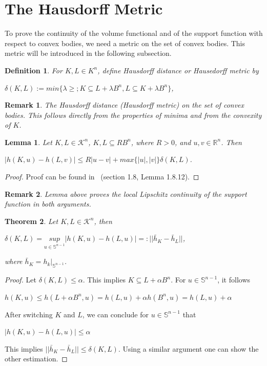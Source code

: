 \documentclass[a4paper]{book}
\newtheorem{theorem}{Theorem}%
\newtheorem{lemma}[theorem]{Lemma}%
\newtheorem{remark}{Remark}%
\newtheorem{definition}{Definition}%
\begin{document}
\section{The Hausdorff Metric}
To prove the continuity of the volume functional and of the support function with respect to convex bodies, we need a metric on the set of convex bodies. This metric will be introduced in the following subsection.

\begin{definition}
    For $K,L\in K^{n}$, define Hausdorff distance or Hausedorff metric by
    \begin{center}
        $\delta(K,L):=min\{\lambda\geq;K\subseteq L+\lambda B^{n},L\subseteq K+\lambda B^{n}\}$,
    \end{center}
\end{definition}

\begin{remark}
    The Hausdorff distance (Hausdorff metric) on the set of convex bodies. This follows directly from the properties of minima and from the convexity of $K$.
\end{remark}

\begin{lemma}
    Let $K,L\in\mathscr{K}^{n}$, $K,L\subseteq RB^{n}$, where $R>0$, and $u,v\in\mathbb{R}^{n}$. Then
    \begin{center}
        $|h(K,u)-h(L,v)|\leq R|u-v|+max\{|u|,|v|\}\delta(K,L)$.
    \end{center}
\end{lemma}
\begin{proof}
    Proof can be found in~\cite{schneider2014convex} (section 1.8, Lemma 1.8.12).
\end{proof}

\begin{remark}
    Lemma above proves the local Lipschitz continuity of the support function in both arguments.
\end{remark}

\begin{theorem}
    Let $K,L\in\mathscr{K}^{n}$, then
    \begin{center}
        $\delta(K,L)=\underset{u\in\mathbb{S}^{n-1}}{sup}|h(K,u)-h(L,u)|=:||\bar{h}_{K}-\bar{h}_{L}||$,
    \end{center}
    where $\bar{h}_{K}=h_{k}|_{\mathbb{S}^{n-1}}$.
\end{theorem}
\begin{proof}
    Let $\delta(K,L)\leq\alpha$. This implies $K\subseteq L+\alpha B^{n}$. For $u\in\mathbb{S}^{n-1}$, it follows 
    \begin{center}
        $h(K,u)\leq h(L+\alpha B^{n},u)=h(L,u)+\alpha h(B^{n},u)=h(L,u)+\alpha$
    \end{center}
    After switching $K$ and $L$, we can conclude for $u\in\mathbb{S}^{n-1}$ that
    \begin{center}
        $|h(K,u)-h(L,u)|\leq\alpha$
    \end{center}
    This implies $||\bar{h}_{K}-\bar{h}_{L}||\leq\delta(K,L)$. Using a similar argument one can show the other estimation.
\end{proof}
\end{document}
